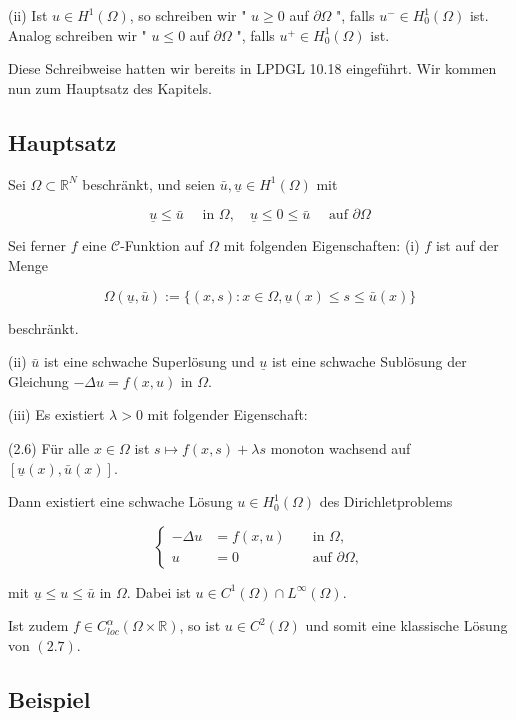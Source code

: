 \documentclass[10pt, letterpaper]{article}
\begin{document}
(ii) Ist $u \in H^{1}(\Omega)$, so schreiben wir " $u \geq 0$ auf $\partial \Omega$ ", falls $u^{-} \in H_{0}^{1}(\Omega)$ ist. Analog schreiben wir " $u \leq 0$ auf $\partial \Omega$ ", falls $u^{+} \in H_{0}^{1}(\Omega)$ ist.

Diese Schreibweise hatten wir bereits in LPDGL 10.18 eingeführt. Wir kommen nun zum Hauptsatz des Kapitels.

\subsection*{Hauptsatz}

Sei $\Omega \subset \mathbb{R}^{N}$ beschränkt, und seien $\bar{u}, \underline{u} \in H^{1}(\Omega)$ mit

$$
\underline{u} \leq \bar{u} \quad \text { in } \Omega, \quad \underline{u} \leq 0 \leq \bar{u} \quad \text { auf } \partial \Omega
$$

Sei ferner $f$ eine $\mathcal{C}$-Funktion auf $\Omega$ mit folgenden Eigenschaften:
(i) $f$ ist auf der Menge

$$
\Omega(\underline{u}, \bar{u}):=\{(x, s): x \in \Omega, \underline{u}(x) \leq s \leq \bar{u}(x)\}
$$

beschränkt.

(ii) $\bar{u}$ ist eine schwache Superlösung und $\underline{u}$ ist eine schwache Sublösung der Gleichung $-\Delta u=f(x, u)$ in $\Omega$.

(iii) Es existiert $\lambda>0$ mit folgender Eigenschaft:

(2.6) Für alle $x \in \Omega$ ist $s \mapsto f(x, s)+\lambda s$ monoton wachsend auf $[\underline{u}(x), \bar{u}(x)]$.

Dann existiert eine schwache Lösung $u \in H_{0}^{1}(\Omega)$ des Dirichletproblems

$$
\left\{\begin{aligned}
-\Delta u & =f(x, u) & & \text { in } \Omega, \\
u & =0 & & \text { auf } \partial \Omega,
\end{aligned}\right.
$$

mit $\underline{u} \leq u \leq \bar{u}$ in $\Omega$. Dabei ist $u \in C^{1}(\Omega) \cap L^{\infty}(\Omega)$.

Ist zudem $f \in C_{l o c}^{\alpha}(\Omega \times \mathbb{R})$, so ist $u \in C^{2}(\Omega)$ und somit eine klassische Lösung von $(2.7)$.

\subsection*{Beispiel}
\end{document}
